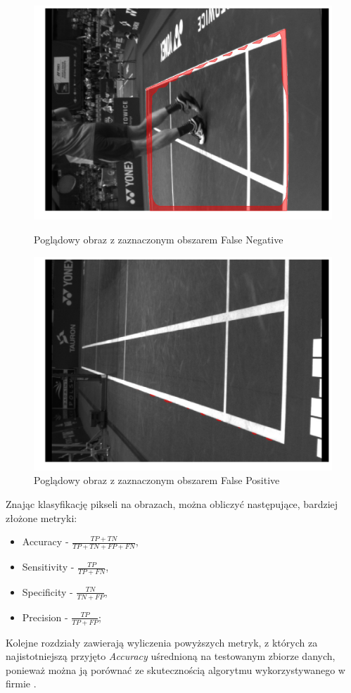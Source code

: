 \begin{figure}[!htb]
    \includegraphics[width=\linewidth]{original_fn_1564911595553287247.jpg}
    \caption{Poglądowy obraz z zaznaczonym obszarem False Negative}
  \endminipage\hfill
    \includegraphics[width=\linewidth]{original_fp_1564953159296706208_5.jpg}
    \caption{Poglądowy obraz z zaznaczonym obszarem False Positive}
  \endminipage\hfill
\end{figure}

Znając klasyfikację pikseli na obrazach, można obliczyć następujące, bardziej złożone metryki:

\begin{itemize}
  \label{sec:miary}
  \item Accuracy - $ \frac{TP + TN}{TP + TN + FP + FN} $,
  \item Sensitivity - $ \frac{TP}{TP + FN} $,
  \item Specificity - $ \frac{TN}{TN + FP} $,
  \item Precision - $ \frac{TP}{TP + FP} $;
\end{itemize}

Kolejne rozdziały zawierają wyliczenia powyższych metryk, z których za najistotniejszą przyjęto \textit{Accuracy} uśrednioną na testowanym zbiorze danych, ponieważ można ją porównać ze skutecznością algorytmu wykorzystywanego w firmie \blue{}.
